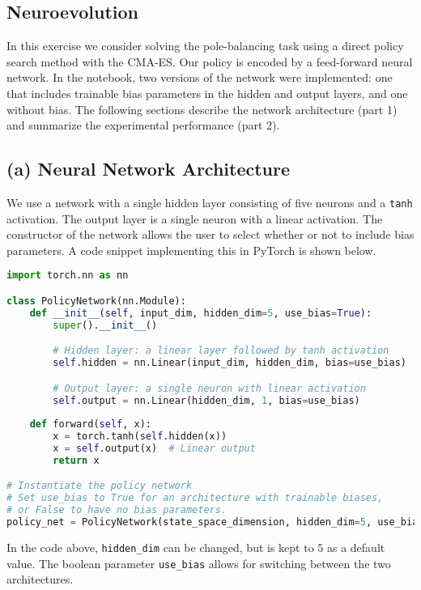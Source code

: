 \subsection{Neuroevolution}

In this exercise we consider solving the pole-balancing task using a direct policy search method with the CMA-ES. Our policy is encoded by a feed-forward neural network. In the notebook, two versions of the network were implemented: one that includes trainable bias parameters in the hidden and output layers, and one without bias. The following sections describe the network architecture (part 1) and summarize the experimental performance (part 2).

\subsection*{(a) Neural Network Architecture}
We use a network with a single hidden layer consisting of five neurons and a \texttt{tanh} activation. The output layer is a single neuron with a linear activation. The constructor of the network allows the user to select whether or not to include bias parameters. A code snippet implementing this in PyTorch is shown below.

\begin{lstlisting}[language=Python, caption={Definition of the policy network.}, basicstyle=\ttfamily\small]
import torch.nn as nn

class PolicyNetwork(nn.Module):
    def __init__(self, input_dim, hidden_dim=5, use_bias=True):
        super().__init__()

        # Hidden layer: a linear layer followed by tanh activation
        self.hidden = nn.Linear(input_dim, hidden_dim, bias=use_bias)

        # Output layer: a single neuron with linear activation
        self.output = nn.Linear(hidden_dim, 1, bias=use_bias)
        
    def forward(self, x):
        x = torch.tanh(self.hidden(x))
        x = self.output(x)  # Linear output
        return x

# Instantiate the policy network
# Set use_bias to True for an architecture with trainable biases,
# or False to have no bias parameters.
policy_net = PolicyNetwork(state_space_dimension, hidden_dim=5, use_bias=True)
\end{lstlisting}

In the code above, \texttt{hidden\_dim} can be changed, but is kept to 5 as a default value. The boolean parameter \texttt{use\_bias} allows for switching between the two architectures.

